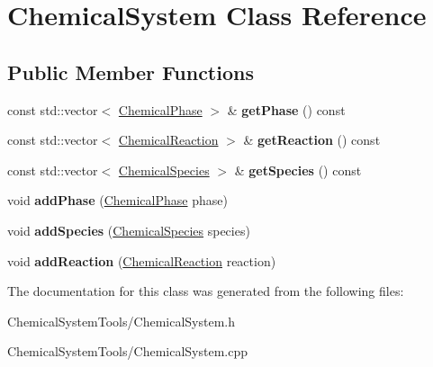 \hypertarget{classChemicalSystem}{
\section{ChemicalSystem Class Reference}
\label{classChemicalSystem}
}
\subsection*{Public Member Functions}
\begin{DoxyCompactItemize}
\item 
\hypertarget{classChemicalSystem_af5329cab016edc282c8c9649bfb9e17b}{
const std::vector$<$ \hyperlink{classChemicalPhase}{ChemicalPhase} $>$ \& {\bfseries getPhase} () const }
\label{classChemicalSystem_af5329cab016edc282c8c9649bfb9e17b}

\item 
\hypertarget{classChemicalSystem_a033fb4111d6a7efae0ac2366934a7075}{
const std::vector$<$ \hyperlink{classChemicalReaction}{ChemicalReaction} $>$ \& {\bfseries getReaction} () const }
\label{classChemicalSystem_a033fb4111d6a7efae0ac2366934a7075}

\item 
\hypertarget{classChemicalSystem_ab7390699dc460d3591681608fc1977f9}{
const std::vector$<$ \hyperlink{classChemicalSpecies}{ChemicalSpecies} $>$ \& {\bfseries getSpecies} () const }
\label{classChemicalSystem_ab7390699dc460d3591681608fc1977f9}

\item 
\hypertarget{classChemicalSystem_ab472cd49dfcc13a513c86862718202e9}{
void {\bfseries addPhase} (\hyperlink{classChemicalPhase}{ChemicalPhase} phase)}
\label{classChemicalSystem_ab472cd49dfcc13a513c86862718202e9}

\item 
\hypertarget{classChemicalSystem_a246cc3cd35ac8f22743a37cc0e3df5cf}{
void {\bfseries addSpecies} (\hyperlink{classChemicalSpecies}{ChemicalSpecies} species)}
\label{classChemicalSystem_a246cc3cd35ac8f22743a37cc0e3df5cf}

\item 
\hypertarget{classChemicalSystem_ab28e575a558063b14317fff90984227e}{
void {\bfseries addReaction} (\hyperlink{classChemicalReaction}{ChemicalReaction} reaction)}
\label{classChemicalSystem_ab28e575a558063b14317fff90984227e}

\end{DoxyCompactItemize}


The documentation for this class was generated from the following files:\begin{DoxyCompactItemize}
\item 
ChemicalSystemTools/ChemicalSystem.h\item 
ChemicalSystemTools/ChemicalSystem.cpp\end{DoxyCompactItemize}
